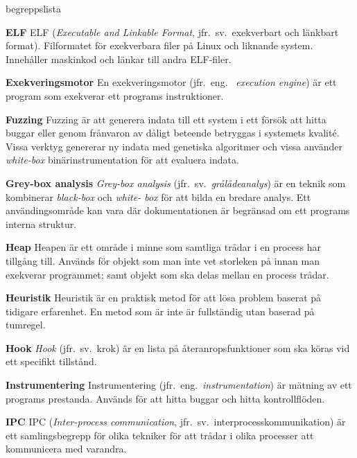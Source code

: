 \begin{labeling}{begreppslista}
    \item [\textbf{ELF}] ELF (\emph{Executable and Linkable Format}, jfr.\ sv.\
    exekverbart och länkbart format). Filformatet för exekverbara filer
    på Linux och liknande system. Innehåller maskinkod och länkar till andra
    ELF-filer.

    \item [\textbf{Exekveringsmotor}] En exekveringsmotor (jfr.\ eng.
    \ \emph{execution engine}) är ett program som exekverar ett programs
    instruktioner.

    \item [\textbf{Fuzzing}] Fuzzing
    är att generera indata till ett system i ett försök att hitta
    buggar eller genom frånvaron av dåligt beteende betryggas i systemets
    kvalité. Vissa verktyg genererar ny indata med genetiska algoritmer
    och vissa använder \emph{white-box} binärinstrumentation för att evaluera indata.

    \item [\textbf{Grey-box analysis}] \emph{Grey-box analysis} (jfr.\ sv.\
    \emph{grålådeanalys}) är en teknik som kombinerar \emph{black-box} och \emph{white-
        box} för att bilda en bredare analys. Ett användingsområde kan vara där
    dokumentationen är begränsad om ett programs interna struktur.

    \item [\textbf{Heap}] Heapen är ett område i minne som samtliga trådar i
    en process har tillgång till. Används för objekt som man inte vet storleken på
    innan man exekverar programmet; samt objekt som ska delas mellan en process
    trådar.

    \item [\textbf{Heuristik}] Heuristik är en praktisk metod för att lösa
    problem baserat på tidigare erfarenhet. En metod som är inte är fullständig
    utan baserad på tumregel.

    \item [\textbf{Hook}] \emph{Hook} (jfr.\ sv.\ krok) är en lista på återanropsfunktioner
    som ska köras vid ett specifikt tillstånd.

    \item [\textbf{Instrumentering}] Instrumentering (jfr.\ eng.\
    \emph{instrumentation}) är mätning av ett programs prestanda. Används för
    att hitta buggar och hitta kontrollflöden.

    \item [\textbf{IPC}] IPC (\emph{Inter-process communication}, jfr.\ sv.\
    interprocesskommunikation) är ett samlingsbegrepp för olika tekniker
    för att trådar i olika processer att kommunicera med varandra.


\end{labeling}
